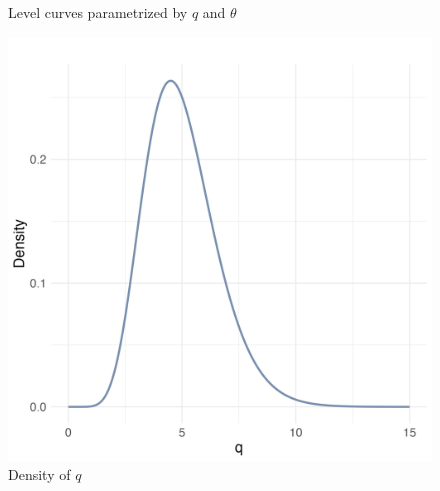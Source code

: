 \documentclass{article}
\begin{document}
\begin{figure}[h!]
\begin{minipage}{0.45\textwidth}
        \caption{Level curves parametrized by $q$ and $\theta$}
    \end{minipage}
    \hfill
    \begin{minipage}{0.45\textwidth}
        \centering
        \includegraphics[width=\linewidth]{plots/density_q_ex3.png}
        \caption{Density of $q$}
    \end{minipage}
\end{figure}










\clearpage
{} %

% 
% 
\end{document}
